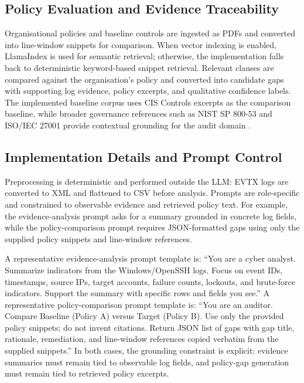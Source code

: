 \documentclass[conference]{IEEEtran}
\begin{document}
\subsection{Policy Evaluation and Evidence Traceability}
Organisational policies and baseline controls are ingested as PDFs and converted into line-window snippets for comparison. When vector indexing is enabled, LlamaIndex is used for semantic retrieval; otherwise, the implementation falls back to deterministic keyword-based snippet retrieval. Relevant clauses are compared against the organisation's policy and converted into candidate gaps with supporting log evidence, policy excerpts, and qualitative confidence labels. The implemented baseline corpus uses CIS Controls excerpts as the comparison baseline, while broader governance references such as NIST SP 800-53 and ISO/IEC 27001 provide contextual grounding for the audit domain \cite{NIST80053,ISO27001,CISControls}.


\subsection{Implementation Details and Prompt Control}
Preprocessing is deterministic and performed outside the LLM: EVTX logs are converted to XML and flattened to CSV before analysis. Prompts are role-specific and constrained to observable evidence and retrieved policy text. For example, the evidence-analysis prompt asks for a summary grounded in concrete log fields, while the policy-comparison prompt requires JSON-formatted gaps using only the supplied policy snippets and line-window references.

A representative evidence-analysis prompt template is: ``You are a cyber analyst. Summarize indicators from the Windows/OpenSSH logs. Focus on event IDs, timestamps, source IPs, target accounts, failure counts, lockouts, and brute-force indicators. Support the summary with specific rows and fields you see.'' A representative policy-comparison prompt template is: ``You are an auditor. Compare Baseline (Policy A) versus Target (Policy B). Use only the provided policy snippets; do not invent citations. Return JSON list of gaps with gap title, rationale, remediation, and line-window references copied verbatim from the supplied snippets.'' In both cases, the grounding constraint is explicit: evidence summaries must remain tied to observable log fields, and policy-gap generation must remain tied to retrieved policy excerpts.
\end{document}
